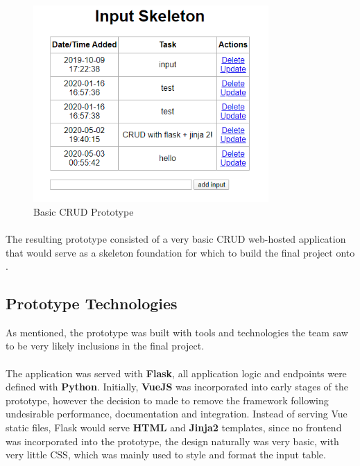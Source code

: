 \begin{figure}[H]
	\caption{Basic CRUD Prototype}
	\label{image:prototype}
	\centering
	\includegraphics[width=0.8\textwidth]{images/prototype.png}
\end{figure}	

\paragraph{}
The resulting prototype consisted of a very basic CRUD web-hosted application that would serve as a skeleton foundation for which to build the final project onto \cite{PROTOTYPE}.

\subsection{Prototype Technologies}
As mentioned, the prototype was built with tools and technologies the team saw to be very likely inclusions in the final project. 

\paragraph{}
The application was served with \textbf{Flask}, all application logic and endpoints were defined with \textbf{Python}. Initially, \textbf{VueJS} was incorporated into early stages of the prototype, however the decision to made to remove the framework following undesirable performance, documentation and integration. Instead of serving Vue static files, Flask would serve \textbf{HTML} and \textbf{Jinja2} templates, since no frontend was incorporated into the prototype, the design naturally was very basic, with very little CSS, which was mainly used to style and format the input table.

